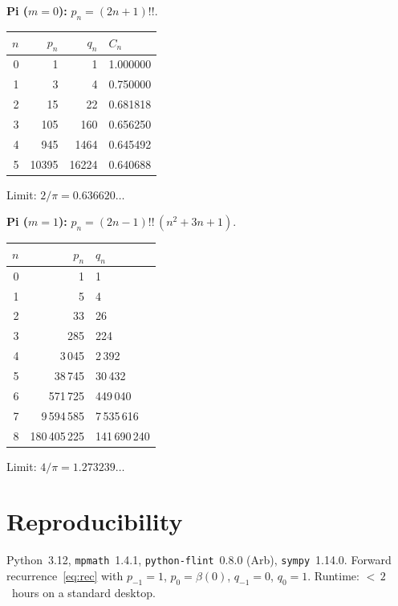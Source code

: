 \documentclass[11pt,a4paper]{article}
\theoremstyle{plain}
\theoremstyle{definition}
\theoremstyle{remark}
\newcommand{\dff}[1]{(#1)!!}
\begin{document}
\medskip
\textbf{Pi ($m{=}0$):} $p_n = (2n{+}1)!!$.

\smallskip
\begin{center}
\begin{tabular}{@{}rrrl@{}}
\toprule
$n$ & $p_n$ & $q_n$ & $C_n$ \\
\midrule
0 & 1 & 1 & 1.000000 \\
1 & 3 & 4 & 0.750000 \\
2 & 15 & 22 & 0.681818 \\
3 & 105 & 160 & 0.656250 \\
4 & 945 & 1464 & 0.645492 \\
5 & 10395 & 16224 & 0.640688 \\
\bottomrule
\end{tabular}
\end{center}
\smallskip\noindent Limit: $2/\pi = 0.636620\ldots$

\medskip
\textbf{Pi ($m{=}1$):}
$p_n = \dff{2n{-}1}\,(n^2{+}3n{+}1)$.

\smallskip
\begin{center}
\begin{tabular}{@{}rrl@{}}
\toprule
$n$ & $p_n$ & $q_n$ \\
\midrule
0 & 1 & 1 \\
1 & 5 & 4 \\
2 & 33 & 26 \\
3 & 285 & 224 \\
4 & 3\,045 & 2\,392 \\
5 & 38\,745 & 30\,432 \\
6 & 571\,725 & 449\,040 \\
7 & 9\,594\,585 & 7\,535\,616 \\
8 & 180\,405\,225 & 141\,690\,240 \\
\bottomrule
\end{tabular}
\end{center}
\smallskip\noindent Limit: $4/\pi = 1.273239\ldots$

\section{Reproducibility}\label{app:repro}

Python~3.12, \texttt{mpmath}~1.4.1,
\texttt{python-flint}~0.8.0 (Arb),
\texttt{sympy}~1.14.0.
Forward recurrence~\eqref{eq:rec} with
$p_{-1}{=}1$, $p_0{=}\beta(0)$, $q_{-1}{=}0$, $q_0{=}1$.
Runtime: ${<}\,2$~hours on a standard desktop.
\end{document}
